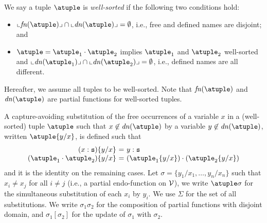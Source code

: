 We say a tuple $\atuple$ is {\em well-sorted} if the following two
conditions hold:
\begin{itemize}
\item
  $\supp{\fn\atuple} \cap \supp{\dn{\atuple}} = \emptyset$, i.e., free and
  defined names are disjoint; and
\item
  $\atuple = \atuple_1 \cdot \atuple_2$ implies $\atuple_1$ and
  $\atuple_2$ well-sorted and $\supp{\dn{\atuple_1}} \cap \supp{\dn{\atuple_2}} =
  \emptyset$, i.e., defined names are all different.
\end{itemize}
%
Hereafter, we assume all tuples to be well-sorted.
%
Note that $\fn{\atuple}$ and $\dn{\atuple}$ are partial functions for
well-sorted tuples.

A capture-avoiding
substitution of the free occurrences of a variable
$x$ in a (well-sorted) tuple $\atuple$ such that $x\not\in \dn{\atuple}$
 by a variable $y\not\in \dn{\atuple}$, written
$\atuple \sust x y$, is defined such that
%
\[
\begin{array}{r@{}l@{\ = \ } ll}
(x  : \asort)
&
\sust x y  
&  
y : \asort
\\
(\atuple_1 \cdot \atuple_2)
&
\sust x y  
& 
(\atuple_1\sust x y) \cdot (\atuple_2\sust x y) 
\end{array}
\]
%
and it is the identity on the remaining cases. Let
$\sigma = \{y_1/x_1,\ldots,y_n/x_n\}$ such that $x_i\neq x_j$ for all
$i\neq j$ (i.e., a partial endo-function on $\mathcal{V}$), we write
$\atuple\sigma$ for the simultaneous substitution of each $x_i$ by
$y_i$.
%
We use $\Sigma$ for the set of all substitutions. We write
$\sigma_1\sigma_2$ for the composition of partial functions with
disjoint domain, and $\sigma_1[\sigma_2]$ for the update of $\sigma_1$
with $\sigma_2$.


